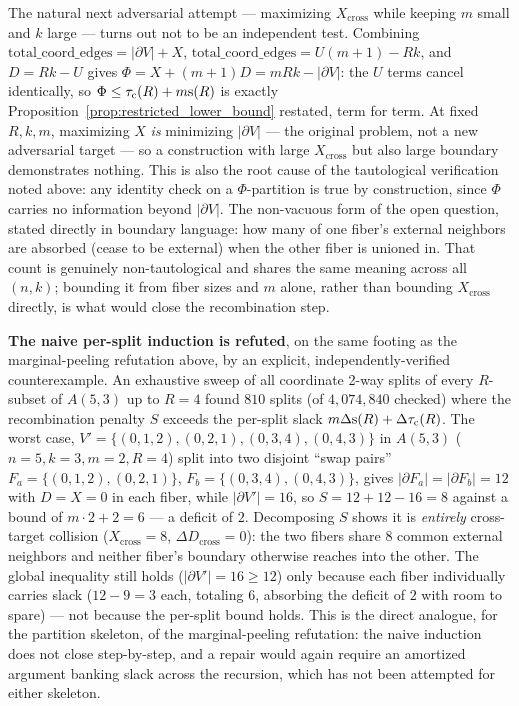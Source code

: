 The natural next adversarial attempt --- maximizing $X_{\text{cross}}$
while keeping $m$ small and $k$ large --- turns out not to be an
independent test. Combining $\mathrm{total\_coord\_edges} = |\partial
V| + X$, $\mathrm{total\_coord\_edges} = U(m+1) - Rk$, and $D = Rk - U$
gives $\Phi = X + (m+1)D = mRk - |\partial V|$: the $U$ terms cancel
identically, so $\Phi \le \tau_{\mathrm{c}}(R) + m\mathrm{s}(R)$ is exactly
Proposition~\ref{prop:restricted_lower_bound} restated, term for term. At fixed
$R,k,m$, maximizing $X$ \emph{is} minimizing $|\partial V|$ --- the
original problem, not a new adversarial target --- so a construction
with large $X_{\text{cross}}$ but also large boundary demonstrates
nothing. This is also the root cause of the tautological verification
noted above: any identity check on a $\Phi$-partition is true by
construction, since $\Phi$ carries no information beyond $|\partial
V|$. The non-vacuous form of the open question, stated directly in
boundary language: how many of one fiber's external neighbors are
absorbed (cease to be external) when the other fiber is unioned in.
That count is genuinely non-tautological and shares the same meaning
across all $(n,k)$; bounding it from fiber sizes and $m$ alone, rather
than bounding $X_{\text{cross}}$ directly, is what would close the
recombination step.

\textbf{The naive per-split induction is refuted}, on the same footing
as the marginal-peeling refutation above, by an explicit,
independently-verified counterexample. An exhaustive sweep of all
coordinate 2-way splits of every $R$-subset of $A(5,3)$ up to $R=4$
found $810$ splits (of $4{,}074{,}840$ checked) where the recombination
penalty $S$ exceeds the per-split slack $m\Delta\mathrm{s}(R)+\Delta\tau_{\mathrm{c}}(R)$.
The worst case, $V' = \{(0,1,2),(0,2,1),(0,3,4),(0,4,3)\}$ in $A(5,3)$
($n=5,k=3,m=2,R=4$) split into two disjoint ``swap pairs''
$F_a=\{(0,1,2),(0,2,1)\}$, $F_b=\{(0,3,4),(0,4,3)\}$, gives
$|\partial F_a|=|\partial F_b|=12$ with $D=X=0$ in each fiber, while
$|\partial V'|=16$, so $S = 12+12-16 = 8$ against a bound of
$m\cdot 2 + 2 = 6$ --- a deficit of $2$. Decomposing $S$ shows it is
\emph{entirely} cross-target collision ($X_{\text{cross}}=8$,
$\Delta D_{\text{cross}}=0$): the two fibers share $8$ common external
neighbors and neither fiber's boundary otherwise reaches into the
other. The global inequality still holds ($|\partial V'|=16 \ge 12$)
only because each fiber individually carries slack ($12-9=3$ each,
totaling $6$, absorbing the deficit of $2$ with room to spare) --- not
because the per-split bound holds. This is the direct analogue, for
the partition skeleton, of the marginal-peeling refutation: the naive
induction does not close step-by-step, and a repair would again require
an amortized argument banking slack across the recursion, which has not
been attempted for either skeleton.

